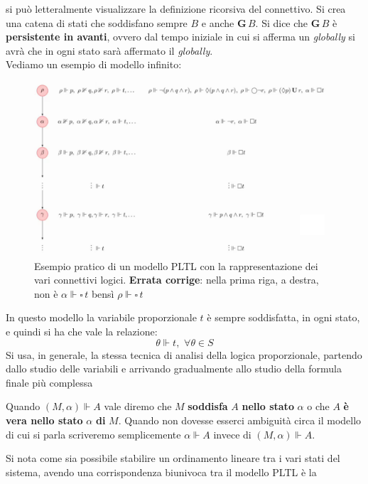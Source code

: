 \documentclass[a4paper,12pt, oneside]{book}
\begin{document}
\begin{esempio}
\begin{figure}[H]
  \end{figure}
  si può letteralmente visualizzare la definizione ricorsiva del connettivo. Si
  crea una catena di stati che soddisfano sempre $B$ e anche $\mathbf{G}\,B$. Si
  dice che $\mathbf{G}\,B$ è \textbf{persistente in avanti}, ovvero dal tempo
  iniziale in cui si afferma un \emph{globally} si avrà che in ogni stato sarà
  affermato il \emph{globally}.\\
  \newpage
  Vediamo un esempio di modello infinito:
  \begin{figure}[H]
    \centering
    \includegraphics[scale = 0.4]{img/pltl6.png}
    \caption{Esempio pratico di un modello PLTL con la rappresentazione dei vari
    connettivi logici. \textbf{Errata corrige}: nella prima riga, a destra, non
    è $\alpha\Vdash \square \, t$ bensì $\rho\Vdash \square \, t$}
  \end{figure}
  In questo modello la variabile proporzionale $t$ è sempre soddisfatta, in ogni
  stato, e quindi si ha che vale la relazione:
  \[\theta\Vdash t,\,\,\forall \theta \in S\]
  Si usa, in generale, la stessa tecnica di analisi della logica proporzionale,
  partendo dallo studio delle variabili e arrivando gradualmente allo studio
  della formula finale più complessa
\end{esempio}
\begin{definizione}
  Quando $(M,\alpha)\Vdash A$ vale diremo che $M$ \textbf{soddisfa} $A$
  \textbf{nello stato} $\alpha$ o che $A$ \textbf{è vera nello stato} $\alpha$
  \textbf{di} $M$. Quando non dovesse esserci ambiguità circa il modello di cui
  si parla scriveremo semplicemente $\alpha\Vdash A$ invece di $(M,\alpha)\Vdash
  A$.  
\end{definizione}
\newpage
Si nota come sia possibile stabilire un ordinamento lineare tra i vari stati
del sistema, avendo una corrispondenza biunivoca tra il modello PLTL è la
\end{document}
